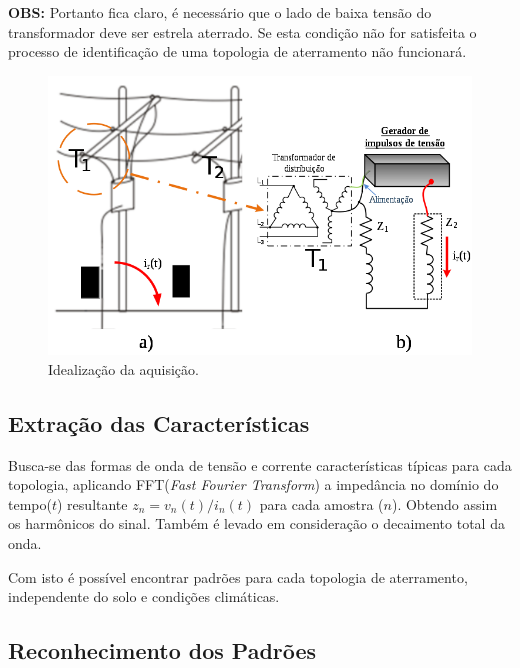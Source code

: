 \documentclass[a4paper, 10pt]{article}
\begin{document}
\textbf{OBS:} Portanto fica claro, é necessário que o lado de baixa tensão
do transformador deve ser estrela aterrado. Se esta condição não for 
satisfeita o processo de identificação de uma topologia de aterramento não 
funcionará.

\begin{figure}[!h]
    \caption{\label{fig_ideia_aquisicao} Idealização da aquisição.}
	    \begin{center}
            \includegraphics[scale=0.4]{../fotos/sinal/trafo.png}
	    \end{center}
\end{figure}

\subsection{Extração das Características}

Busca-se das formas de onda de tensão e corrente características típicas para 
cada topologia, aplicando FFT(\textit{Fast Fourier Transform}) a impedância 
no domínio do tempo($t$) resultante $z_n=v_n(t)/i_n(t)$ para cada amostra ($n$).
Obtendo assim os harmônicos do sinal. Também é levado em consideração
o decaimento total da onda.

Com isto é possível encontrar padrões para cada topologia de aterramento, independente
do solo e condições climáticas.

\subsection{Reconhecimento dos Padrões}
\end{document}
